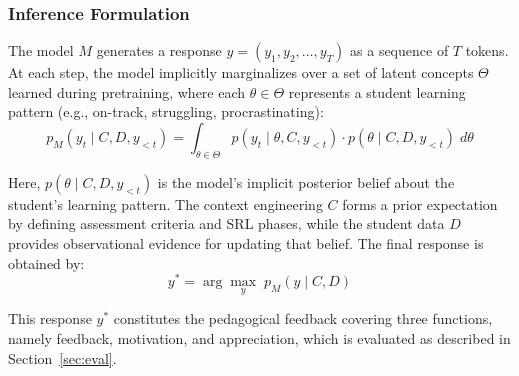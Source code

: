 \documentclass[conference,a4paper]{IEEEtran}
\begin{document}
\subsubsection{Inference Formulation}

The model $M$ generates a response 
$y = (y_1, y_2, \ldots, y_T)$ as a sequence of $T$ 
tokens. At each step, the model implicitly marginalizes 
over a set of latent concepts $\Theta$ learned during 
pretraining, where each $\theta \in \Theta$ represents 
a student learning pattern (e.g., on-track, struggling, 
procrastinating):
\begin{equation}\label{eq:marginal}
    p_M(y_t \mid C, D, y_{<t}) = \int_{\theta \in \Theta} 
    p(y_t \mid \theta, C, y_{<t}) \cdot 
    p(\theta \mid C, D, y_{<t}) \; d\theta
\end{equation}

\noindent Here, $p(\theta \mid C, D, y_{<t})$ is the 
model's implicit posterior belief about the student's 
learning pattern. The context engineering $C$ forms a 
prior expectation by defining assessment criteria and 
SRL phases, while the student data $D$ provides 
observational evidence for updating that belief. 
The final response is obtained by:
\begin{equation}\label{eq:generation}
    y^* = \arg\max_{y} \; p_M(y \mid C, D)
\end{equation}

This response $y^*$ constitutes the pedagogical 
feedback covering three functions, namely feedback,
motivation, and appreciation, which is evaluated 
as described in Section~\ref{sec:eval}.


%
\end{document}
